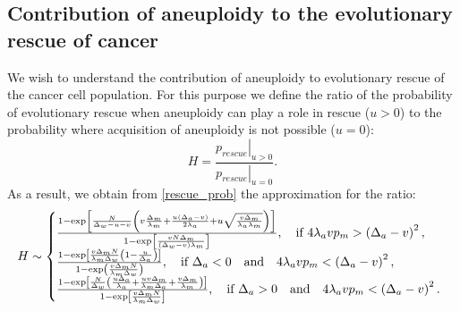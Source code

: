\documentclass[12pt]{extarticle}
\begin{document}
\subsection*{Contribution of aneuploidy to the evolutionary rescue of cancer}
We wish to understand the contribution of aneuploidy to evolutionary rescue of the cancer cell population. For this purpose we define the ratio of the probability of evolutionary rescue when aneuploidy can play a role in rescue ($u>0$) to the probability where acquisition of aneuploidy is not possible ($u=0$):
\begin{equation}\label{ratiorescueexact}
H=\frac{\left.p_{rescue}\right|_{u>0}}{\left.p_{rescue}\right|_{u=0}}.
\end{equation}
As a result, we obtain from \eqref{rescue_prob} the approximation for the ratio:
\begin{equation}\label{ratiorescue}
H\sim\left\{
  \begin{array}{@{}ll@{}}
  \frac{1-\exp\left[\frac{N}{\Delta_w-u-v}\left(v\frac{\Delta_m}{\lambda_m}+\frac{u\left(\Delta_a-v\right)}{2\lambda_a}+u\sqrt{\frac{v\Delta_m}{\lambda_a\lambda_m}}\right)\right]}{1-\exp\left[\frac{vN\Delta_m}{\left(\Delta_w-v\right)\lambda_m}\right]},\quad\text{if }4\lambda_avp_m>\left(\Delta_a-v\right)^2,\\
   \frac{1-\exp\left[\frac{v\Delta_mN}{\lambda_m\Delta_w}\left(1-\frac{u}{\Delta_a}\right)\right]}{1-\exp\left(\frac{v\Delta_mN}{\lambda_m\Delta_w}\right)},\quad\text{if }\Delta_a<0\quad\text{and}\quad4\lambda_avp_m<\left(\Delta_a-v\right)^2,\\
   \frac{1-\exp\left[\frac{N}{\Delta_w}\left(\frac{u\Delta_a}{\lambda_a}+\frac{uv\Delta_m}{\lambda_m\Delta_a}+\frac{v\Delta_m}{\lambda_m}\right)\right]}{1-\exp\left[\frac{v\Delta_mN}{\lambda_m\Delta_w}\right]},\quad\text{if }\Delta_a>0\quad\text{and}\quad4\lambda_avp_m<\left(\Delta_a-v\right)^2.
  \end{array}\right.
\end{equation}
\end{document}
